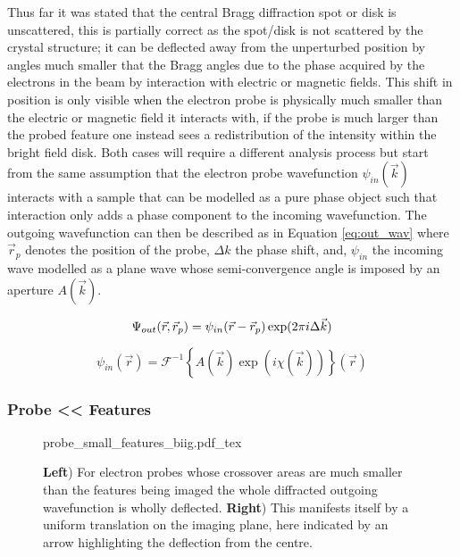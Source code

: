 Thus far it was stated that the central Bragg diffraction spot or disk is unscattered, this is partially correct as the spot/disk is not scattered by the crystal structure; it can be deflected away from the unperturbed position by angles much smaller that the Bragg angles due to the phase acquired by the electrons in the beam by interaction with electric or magnetic fields.
This shift in position is only visible when the electron probe is physically much smaller than the electric or magnetic field it interacts with, if the probe is much larger than the probed feature one instead sees a redistribution of the intensity within the bright field disk. Both cases will require a different analysis process but start from the same assumption that the electron probe wavefunction $\psi_{in}(\vec{k})$ interacts with a sample that can be modelled as a pure phase object such that interaction only adds a phase component to the incoming wavefunction\cite{caoTheoryPracticeElectron2018, lazicPhaseContrastSTEM2016}. The outgoing wavefunction can then be described as in Equation \ref{eq:out_wav} where $\vec{r}_p$ denotes the position of the probe, $\Delta k$ the phase shift, and, $\psi_{in}$ the incoming wave modelled as a plane wave whose semi-convergence angle is imposed by an aperture $A(\vec{k})$.

\begin{equation}
    \Psi_{out}(\vec{r},\vec{r}_p)=\psi_{in}(\vec{r}-\vec{r}_p)\exp(2\pi i \Delta \vec{k})\\
    \label{eq:out_wav}
\end{equation}

\begin{equation}
    \psi_{in}(\vec{r})=\mathcal{F}^{-1}\left\{A(\vec{k})\exp(i\chi(\vec{k}))\right\}(\vec{r})
    \label{eq:in_wav}
\end{equation}

\subsubsection{Probe << Features}

\begin{figure}[h]
	\centering
	\def\svgwidth{1\linewidth}
	{probe_small_features_biig.pdf_tex}
    \caption{\textbf{Left}) For electron probes whose crossover areas are much smaller than the features being imaged the whole diffracted outgoing wavefunction is wholly deflected. \textbf{Right}) This manifests itself by a uniform translation on the imaging plane, here indicated by an arrow highlighting the deflection from the centre.}
	\label{fig:small_probe}
\end{figure}

